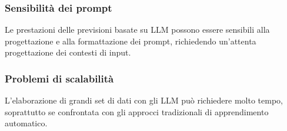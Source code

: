 \subsubsection{Sensibilità dei prompt}
Le prestazioni delle previsioni basate su LLM possono essere sensibili alla progettazione e alla formattazione dei prompt, richiedendo un'attenta progettazione dei contesti di input.

\subsubsection{Problemi di scalabilità}
L'elaborazione di grandi set di dati con gli LLM può richiedere molto tempo, soprattutto se confrontata con gli approcci tradizionali di apprendimento automatico.

